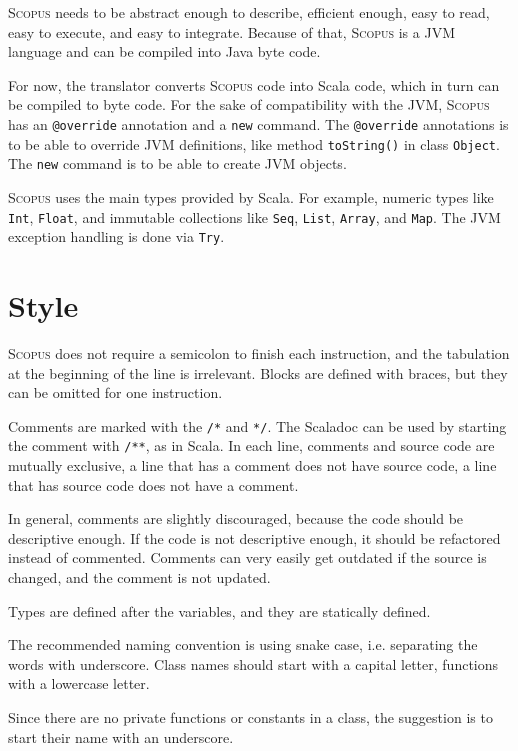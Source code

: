 \documentclass[12pt,a4paper]{book}
\makeatletter
\newcommand{\srccode}[1]{\texttt{{#1}}}
\newcommand{\reservedWord}[1]{{\color{blue}\srccode{#1}}\xspace}
\newcommand{\annotation}[1]{{\color{brown}\srccode{#1}}\xspace}
\newcommand{\snew}{\reservedWord{new}}
\newcommand{\soverride}{\annotation{@override}}
\newcommand{\Scopus}{\textsc{Scopus}\xspace}
\makeatother
\begin{document}
    \Scopus needs to be abstract enough to describe, efficient enough, easy to read, easy to execute, and easy to integrate.
    Because of that, \Scopus is a JVM language and can be compiled into Java byte code.

    For now, the translator converts \Scopus code into Scala code, which in turn can be compiled to byte code.
    For the sake of compatibility with the JVM, \Scopus has an \soverride annotation and a \snew command.
    The \soverride annotations is to be able to override JVM definitions, like method \srccode{toString()} in class \srccode{Object}.
    The \snew command is to be able to create JVM objects.

    \Scopus uses the main types provided by Scala.
    For example, numeric types like \srccode{Int}, \srccode{Float}, and immutable collections like \srccode{Seq}, \srccode{List}, \srccode{Array}, and \srccode{Map}.
    The JVM exception handling is done via \srccode{Try}.


    \section{Style}

    \Scopus does not require a semicolon to finish each instruction, and the tabulation at the beginning of the line is irrelevant.
    Blocks are defined with braces, but they can be omitted for one instruction.

    Comments are marked with the \srccode{/*} and  \srccode{*/}.
    The Scaladoc can be used by starting the comment with \srccode{/**}, as in Scala.
    In each line, comments and source code are mutually exclusive, a line that has a comment does not have source code, a line that has source code does not have a comment.

    In general, comments are slightly discouraged, because the code should be descriptive enough.
    If the code is not descriptive enough, it should be refactored instead of commented.
    Comments can very easily get outdated if the source is changed, and the comment is not updated.

    Types are defined after the variables, and they are statically defined.

    The recommended naming convention is using snake case, i.e. separating the words with underscore.
    Class names should start with a capital letter, functions with a lowercase letter.

    Since there are no private functions or constants in a class, the suggestion is to start their name with an underscore.
\end{document}
